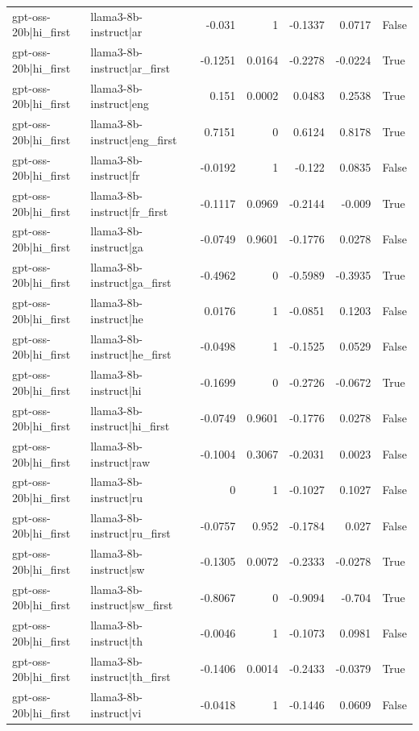 \begin{table}
\begin{tabular}{l l r r r r l}
gpt-oss-20b|hi_first & llama3-8b-instruct|ar & -0.031 & 1 & -0.1337 & 0.0717 & False \\
gpt-oss-20b|hi_first & llama3-8b-instruct|ar_first & -0.1251 & 0.0164 & -0.2278 & -0.0224 & True \\
gpt-oss-20b|hi_first & llama3-8b-instruct|eng & 0.151 & 0.0002 & 0.0483 & 0.2538 & True \\
gpt-oss-20b|hi_first & llama3-8b-instruct|eng_first & 0.7151 & 0 & 0.6124 & 0.8178 & True \\
gpt-oss-20b|hi_first & llama3-8b-instruct|fr & -0.0192 & 1 & -0.122 & 0.0835 & False \\
gpt-oss-20b|hi_first & llama3-8b-instruct|fr_first & -0.1117 & 0.0969 & -0.2144 & -0.009 & True \\
gpt-oss-20b|hi_first & llama3-8b-instruct|ga & -0.0749 & 0.9601 & -0.1776 & 0.0278 & False \\
gpt-oss-20b|hi_first & llama3-8b-instruct|ga_first & -0.4962 & 0 & -0.5989 & -0.3935 & True \\
gpt-oss-20b|hi_first & llama3-8b-instruct|he & 0.0176 & 1 & -0.0851 & 0.1203 & False \\
gpt-oss-20b|hi_first & llama3-8b-instruct|he_first & -0.0498 & 1 & -0.1525 & 0.0529 & False \\
gpt-oss-20b|hi_first & llama3-8b-instruct|hi & -0.1699 & 0 & -0.2726 & -0.0672 & True \\
gpt-oss-20b|hi_first & llama3-8b-instruct|hi_first & -0.0749 & 0.9601 & -0.1776 & 0.0278 & False \\
gpt-oss-20b|hi_first & llama3-8b-instruct|raw & -0.1004 & 0.3067 & -0.2031 & 0.0023 & False \\
gpt-oss-20b|hi_first & llama3-8b-instruct|ru & 0 & 1 & -0.1027 & 0.1027 & False \\
gpt-oss-20b|hi_first & llama3-8b-instruct|ru_first & -0.0757 & 0.952 & -0.1784 & 0.027 & False \\
gpt-oss-20b|hi_first & llama3-8b-instruct|sw & -0.1305 & 0.0072 & -0.2333 & -0.0278 & True \\
gpt-oss-20b|hi_first & llama3-8b-instruct|sw_first & -0.8067 & 0 & -0.9094 & -0.704 & True \\
gpt-oss-20b|hi_first & llama3-8b-instruct|th & -0.0046 & 1 & -0.1073 & 0.0981 & False \\
gpt-oss-20b|hi_first & llama3-8b-instruct|th_first & -0.1406 & 0.0014 & -0.2433 & -0.0379 & True \\
gpt-oss-20b|hi_first & llama3-8b-instruct|vi & -0.0418 & 1 & -0.1446 & 0.0609 & False \\

\end{tabular}
\end{table}
